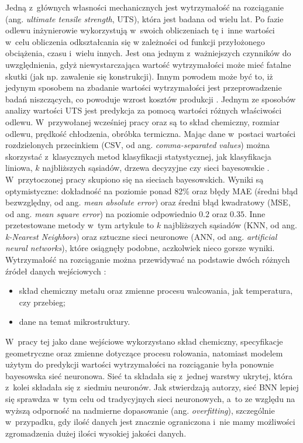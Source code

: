 Jedną z~głównych własności mechanicznych jest wytrzymałość na rozciąganie (ang. \textit{ultimate tensile strength}, UTS), która jest badana od wielu lat. Po fazie odlewu inżynierowie wykorzystują w~swoich obliczeniach tę i~inne wartości w~celu obliczenia odkształcania się w zależności od funkcji przyłożonego obciążenia, czasu i~wielu innych. Jest ona jednym z~ważniejszych czynników do uwzględnienia, gdyż niewystarczająca wartość wytrzymałości może mieć fatalne skutki (jak np. zawalenie się konstrukcji). Innym powodem może być to, iż jedynym sposobem na zbadanie wartości wytrzymałości jest przeprowadzenie badań niszczących, co powoduje wzrost kosztów produkcji \cite{Santos09}. Jednym ze sposobów analizy wartości UTS jest predykcja za pomocą wartości różnych właściwości odlewu. W~przywołanej wcześniej pracy \cite{Santos09} oraz \cite{Nieves09} są to skład chemiczny, rozmiar odlewu, prędkość chłodzenia, obróbka termiczna. Mając dane w~postaci wartości rozdzielonych przecinkiem (CSV, od ang. \textit{comma-separated values}) można skorzystać z~klasycznych metod klasyfikacji statystycznej, jak klasyfikacja liniowa, $k$ najbliższych sąsiadów, drzewa decyzyjne czy sieci bayesowskie \cite{wiki:klas.stat}. W~przytoczonej pracy skupiono się na sieciach bayesowskich. Wyniki są optymistyczne: dokładność na poziomie ponad 82\% oraz błędy MAE (średni błąd bezwzględny, od ang. \textit{mean absolute error}) oraz średni błąd kwadratowy (MSE, od ang. \textit{mean square error}) na poziomie odpowiednio $0.2$ oraz $0.35$. Inne przetestowane metody w~tym artykule to $k$ najbliższych sąsiadów (KNN, od ang. \textit{k-Nearest Neighbors}) oraz sztuczne sieci neuronowe (ANN, od ang. \textit{artificial neural networks}), które osiągnęły podobne, aczkolwiek nieco gorsze wyniki. 
Wytrzymałość na rozciąganie można przewidywać na podstawie dwóch różnych źródeł danych wejściowych \cite{Yang16}:
\begin{itemize}
\item
skład chemiczny metalu oraz zmienne procesu walcowania, jak temperatura, czy przebieg;
\item
dane na temat mikrostruktury. 
\end{itemize} 

\noindent W~pracy tej jako dane wejściowe wykorzystano skład chemiczny, specyfikacje geometryczne oraz zmienne dotyczące procesu rolowania, natomiast modelem użytym do predykcji wartości wytrzymałości na rozciąganie była ponownie bayesowska sieć neuronowa. Sieć ta składała się z~jednej warstwy ukrytej, która z~kolei składała się z~siedmiu neuronów. Jak stwierdzają autorzy, sieć BNN lepiej się sprawdza w~tym celu od tradycyjnych sieci neuronowych, a~to ze względu na wyższą odporność na nadmierne dopasowanie (ang. \textit{overfitting}), szczególnie w~przypadku, gdy ilość danych jest znacznie ograniczona i~nie mamy możliwości zgromadzenia dużej ilości wysokiej jakości danych.
    
